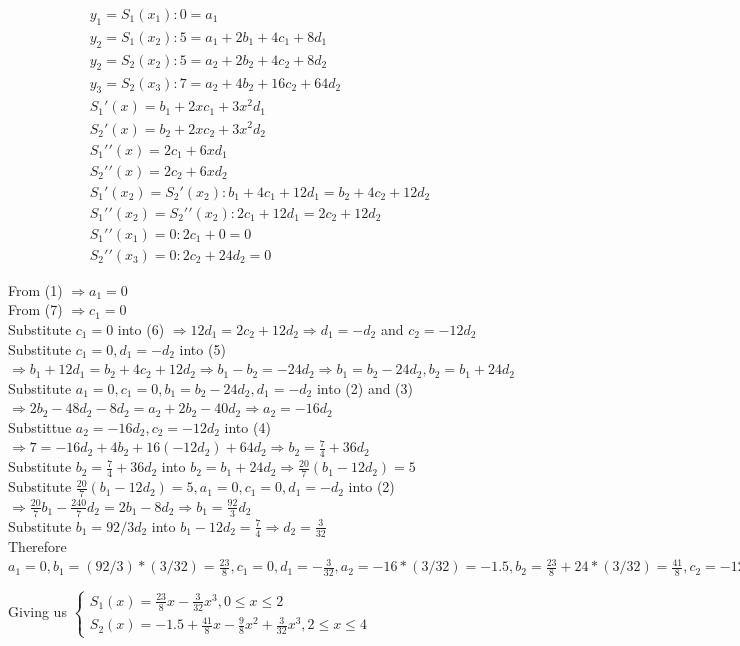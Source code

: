 \documentclass{article}
\begin{document}
\begin{enumerate}[1.]
\begin{gather} \label{eq:1}
y_1 = S_1(x_1) : 0 = a_1 \\
y_2 = S_1(x_2) : 5 = a_1 + 2b_1 + 4c_1 + 8d_1 \\
y_2 = S_2(x_2) : 5 = a_2 + 2b_2 + 4c_2 + 8d_2 \\
y_3 = S_2(x_3) : 7 = a_2 + 4b_2 + 16c_2 + 64d_2 \\
S_1\prime(x) = b_1 + 2xc_1 + 3x^2d_1 \nonumber \\
S_2\prime(x) = b_2 + 2xc_2 + 3x^2d_2 \nonumber \\
S_1\prime\prime(x) = 2c_1 + 6xd_1 \nonumber \\
S_2\prime\prime(x) = 2c_2 + 6xd_2 \nonumber \\
S_1\prime(x_2)  = S_2\prime(x_2):  b_1 + 4c_1 + 12d_1 = b_2 + 4c_2 + 12d_2\\
S_1\prime\prime(x_2) = S_2\prime\prime(x_2) : 2c_1 + 12d_1 = 2c_2 + 12d_2\\
S_1\prime\prime(x_1) = 0 : 2c_1 + 0 = 0 \\
S_2\prime\prime(x_3) = 0 : 2c_2 + 24d_2 = 0
\end{gather}

From (1) $\Rightarrow a_1 = 0$ \\
From (7) $\Rightarrow c_1 = 0$ \\
Substitute $c_1 = 0$ into (6) $\Rightarrow 12d_1 = 2c_2 + 12d_2 \Rightarrow d_1 = -d_2$ and $c_2 = -12d_2$\\
Substitute $c_1 = 0, d_1 = -d_2$ into (5) $\Rightarrow b_1 + 12d_1 = b_2 + 4c_2 + 12d_2 \Rightarrow b_1 - b_2 = -24d_2 \Rightarrow b_1 = b_2 - 24d_2, b_2 = b_1 + 24d_2$ \\
Substitute $a_1 = 0, c_1 = 0, b_1 = b_2 - 24d_2, d_1 = -d_2$ into (2) and (3) $\Rightarrow 2b_2 - 48d_2 - 8d_2 = a_2 + 2b_2 - 40d_2 \Rightarrow a_2 = -16d_2$ \\
Substittue $a_2 = -16d_2, c_2 = -12d_2$ into (4) $\Rightarrow 7 = -16d_2 + 4b_2 + 16(-12d_2) + 64d_2 \Rightarrow b_2 = \frac{7}{4} + 36d_2$ \\
Substitute $b_2 = \frac{7}{4} + 36d_2$ into $b_2 = b_1 + 24d_2 \Rightarrow \frac{20}{7}(b_1 - 12d_2) = 5$ \\
Substitute $ \frac{20}{7}(b_1 - 12d_2) = 5, a_1 = 0, c_1 = 0, d_1 = -d_2$ into (2) $\Rightarrow \frac{20}{7}b_1 - \frac{240}{7}d_2 = 2b_1 - 8d_2 \Rightarrow b_1 = \frac{92}{3}d_2$ \\
Substitute $b_1 = 92/3d_2$ into $b_1 - 12d_2 = \frac{7}{4} \Rightarrow d_2 = \frac{3}{32}$ \\

Therefore $a_1 = 0, b_1 = (92/3) * (3/32) = \frac{23}{8}, c_1 = 0, d_1 = -\frac{3}{32}, a_2 = -16 * (3/32) = -1.5, b_2 = \frac{23}{8} + 24 * (3/32) = \frac{41}{8}, c_2 = -12 * \frac{3}{32} = -\frac{9}{8}, d_2 = \frac{3}{32}$

Giving us
$\begin{cases} 
S_1(x) = \frac{23}{8}x - \frac{3}{32}x^3, 0 \leq x \leq 2 & \\
S_2(x) = -1.5 + \frac{41}{8}x - \frac{9}{8}x^2 + \frac{3}{32}x^3, 2 \leq x \leq 4
\end{cases}
$

\end{enumerate}
\end{document}

